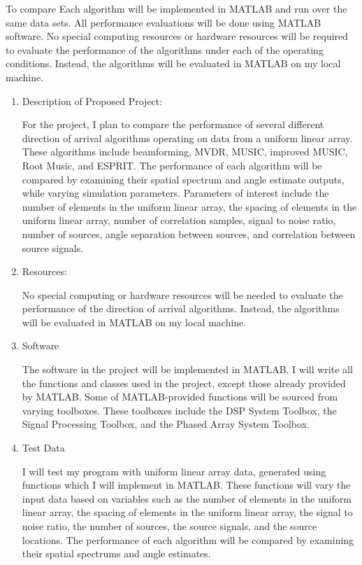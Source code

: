 \documentclass{article}
\begin{document}
	To compare Each algorithm will be implemented in MATLAB and run over the same data sets. 
	All performance evaluations will be done using MATLAB software.  No special computing resources or hardware resources will be required to evaluate the performance of the algorithms under each of the operating conditions. Instead, the algorithms will be evaluated in MATLAB on my local machine.
	
	\begin{enumerate}
		\item Description of Proposed Project:
		
			For the project, I plan to compare the performance of several different direction of arrival algorithms operating on data from a uniform linear array. These algorithms include beamforming, MVDR, MUSIC, improved MUSIC, Root Music, and ESPRIT. The performance of each algorithm will be compared by examining their spatial spectrum and angle estimate outputs, while varying simulation parameters. Parameters of interest include the number of elements in the uniform linear array, the spacing of elements in the uniform linear array, number of correlation samples, signal to noise ratio, number of sources, angle separation between sources, and correlation between source signals. 
			
		\item Resources:
		
			No special computing or hardware resources will be needed to evaluate the performance of the direction of arrival algorithms. Instead, the algorithms will be evaluated in MATLAB on my local machine.
			
		\item Software
		
			The software in the project will be implemented in MATLAB. I will write all the functions and classes used in the project, except those already provided by MATLAB. Some of MATLAB-provided functions will be sourced from varying toolboxes. These toolboxes include the DSP System Toolbox, the Signal Processing Toolbox, and the Phased Array System Toolbox.
			
		\item Test Data	
			
			I will test my program with uniform linear array data, generated using functions which I will implement in MATLAB. These functions will vary the input data based on variables such as the number of elements in the uniform linear array, the spacing of elements in the uniform linear array, the signal to noise ratio, the number of sources, the source signals, and the source locations. The performance of each algorithm will be compared by examining their spatial spectrums and angle estimates.
			
	\end{enumerate}	
	
	\nocite{doa_algorithms_raghu}
	\nocite{mvdr_montlouis}
	\nocite{capon_sanudin}
	\nocite{music_chowdhury}
	\nocite{improved_music_gupta}
	\nocite{root_music_esprit_patwari}
	\nocite{esprit_ning}
	\newpage
	{}
	
\end{document}
